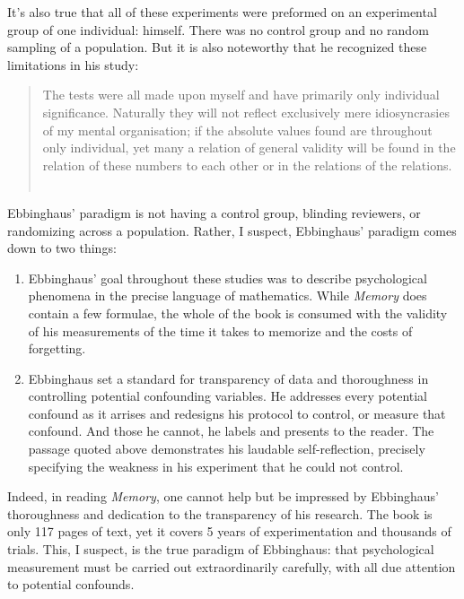 \begin{refsection}
It’s also true that all of these experiments were preformed on an experimental group of one individual: himself. There was no control group and no random sampling of a population. But it is also noteworthy that he recognized these limitations in his study: 

\begin{quote}

The tests were all made upon myself and have primarily only individual significance. Naturally they will not reflect exclusively mere idiosyncrasies of my mental organisation; if the absolute values found are throughout only individual, yet many a relation of general validity will be found in the relation of these numbers to each other or in the relations of the relations. ~\citep[Author’s preface, p. v]{Ebbinghaus:1885ud}
\end{quote}

Ebbinghaus’ paradigm is not having a control group, blinding reviewers, or randomizing across a population. Rather, I suspect, Ebbinghaus’ paradigm comes down to two things:

\begin{enumerate}
\item Ebbinghaus’ goal throughout these studies was to describe psychological phenomena in the precise language of mathematics. While \emph{Memory} does contain a few formulae, the whole of the book is consumed with the validity of his measurements of the time it takes to memorize and the costs of forgetting.

\item Ebbinghaus set a standard for transparency of data and thoroughness in controlling potential confounding variables. He addresses every potential confound as it arrises and redesigns his protocol to control, or measure that confound. And those he cannot, he labels and presents to the reader. The passage quoted above demonstrates his laudable self-reflection, precisely specifying the weakness in his experiment that he could not control.

\end{enumerate}

Indeed, in reading \emph{Memory}, one cannot help but be impressed by Ebbinghaus’ thoroughness and dedication to the transparency of his research. The book is only 117 pages of text, yet it covers 5 years of experimentation and thousands of trials. This, I suspect, is the true paradigm of Ebbinghaus: that psychological measurement must be carried out extraordinarily carefully, with all due attention to potential confounds.


\end{refsection}
